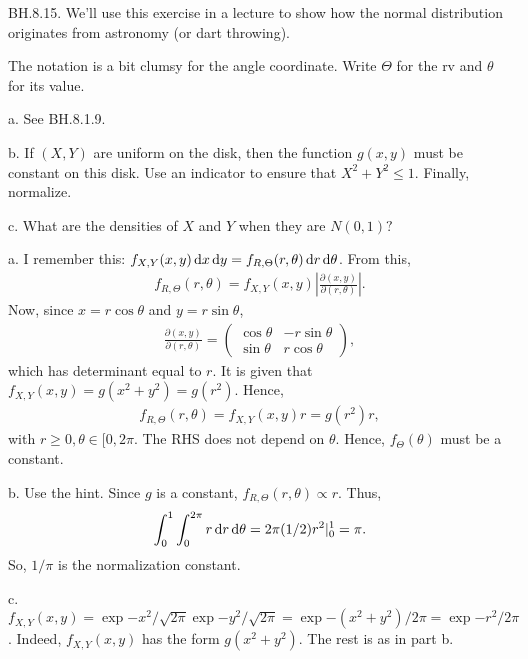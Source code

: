 \begin{exercise} BH.8.15. We'll use this exercise in a lecture to show how the normal distribution originates from astronomy (or dart throwing).

The notation is a bit clumsy for the angle coordinate. Write $\Theta$ for the rv and $\theta$ for its value.
\begin{hint}
a. See BH.8.1.9.

b. If $(X,Y)$ are uniform on the disk, then the function $g(x,y)$ must be constant on this disk. Use an indicator to ensure that $X^2+Y^2\leq 1$. Finally, normalize.

c. What are the densities of $X$ and $Y$ when they are $N(0,1)?$
\end{hint}

\begin{solution}
a.  I remember this: $f_{X,Y}(x,y) \,\textrm{d}x \,\textrm{d}y = f_{R, \Theta}(r, \theta) \,\textrm{d}r \,\textrm{d}\theta$. From this,
\begin{align*}
f_{R, \Theta}(r, \theta)  = f_{X,Y}(x,y) \left| \frac{\partial (x,y)}{\partial(r, \theta)} \right|.
\end{align*}
Now, since $x=r\cos \theta$ and $y=r \sin \theta$,
\begin{align*}
\frac{\partial (x,y)}{\partial(r, \theta)} =
  \begin{pmatrix}
    \cos \theta & -r \sin \theta \\
 \sin \theta & r \cos \theta
  \end{pmatrix},
\end{align*}
which has determinant equal to $r$.
It is given that $f_{X,Y}(x,y)=g(x^2+y^2) = g(r^2)$. Hence,
\begin{align*}
f_{R, \Theta}(r, \theta)  = f_{X,Y}(x,y) r = g(r^2)r,
\end{align*}
with $r\geq 0, \theta\in[0, 2\pi$.
The RHS  does not  depend on $\theta$. Hence, $f_{\Theta}(\theta)$ must be a constant.

b. Use the hint. Since $g$ is a constant, $f_{R, \Theta}(r, \theta) \propto r$. Thus,
\begin{align*}
  \int_{0}^{1}\int_{0}^{2\pi} r \,\textrm{d}r \,\textrm{d}\theta = 2\pi (1/2) r^{2}|_0^{1} = \pi.
\end{align*}
So, $1/\pi$ is the normalization constant.

c. $f_{X,Y}(x,y) = \exp{-x^2}/\sqrt{2\pi}\exp{-y^{2}}/\sqrt{2\pi} = \exp{-(x^2+y^2)/2\pi} = \exp{-r^{2}}/2\pi$. Indeed, $f_{X,Y}(x,y)$ has the form $g(x^2+y^2)$. The rest is as in part b.
\end{solution}
\end{exercise}

